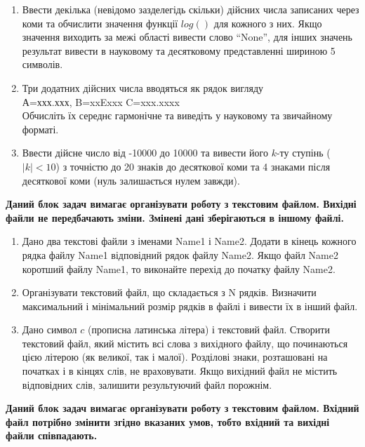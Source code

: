\documentclass[a5paper,titlepage,openany,twoside,draft]{book_unv}%
\begin{document}
\begin{enumerate}
\def\labelenumi{\arabic{enumi})}
\setcounter{enumi}{5}
\item
  Ввести декілька (невідомо зазделегідь скільки) дійсних числа записаних
  через коми та обчислити значення функції $log()$ для кожного з них. Якщо
  значення виходить за межі області вивести слово ``None'', для інших
  значень результат вивести в науковому та десятковому представленні
  шириною 5 символів.
\item
  Три додатних дійсних числа вводяться як рядок вигляду \\
  А=ххх.ххх, B=xxExxx C=xxx.xxxx\\
  Обчисліть їх середнє гармонічне та виведіть у науковому та звичайному
  форматі.
\item
  Ввести дійсне число від -10000 до 10000 та вивести його $k$-ту ступінь
  ($|k|<10$) з точністю до 20 знаків до десяткової коми та 4
  знаками після десяткової коми (нуль залишається нулем завжди).
\end{enumerate}

\textbf{Даний блок задач вимагає організувати роботу з текстовим файлом.
 Вихідні файли не передбачають зміни. Змінені дані зберігаються в іншому файлі.}

\begin{enumerate}
\def\labelenumi{\arabic{enumi})}
\setcounter{enumi}{8}
\item
  Дано два текстові файли з іменами Name1 і Name2. Додати в кінець
  кожного рядка файлу Name1 відповідний рядок файлу Name2. Якщо файл
  Name2 коротший файлу Name1, то виконайте перехід до початку файлу
  Name2.
\item
  Організувати текстовий файл, що складається з N рядків. Визначити
  максимальний і мінімальний розмір рядків в файлі і вивести їх в інший
  файл.

\item
  Дано символ $c$ (прописна латинська літера) і текстовий файл. Створити
  текстовий файл, який містить всі слова з вихідного файлу, що
  починаються цією літерою (як великої, так і малої). Розділові знаки,
  розташовані на початках і в кінцях слів, не враховувати. Якщо вихідний
  файл не містить відповідних слів, залишити результуючий файл порожнім.
\end{enumerate}

\textbf{Даний блок задач вимагає організувати роботу з текстовим файлом. 
Вхідний файл потрібно змінити згідно вказаних умов, тобто вхідний та вихідні файли
співпадають.}
\end{document}

